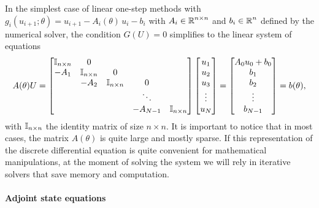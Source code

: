In the simplest case of linear one-step methods with $g_i (u_{i+1}; \theta) = u_{i+1} - A_i (\theta) \, u_i - b_i$ with $A_i \in \operatorname{\mathbb{R}}^{n \times n}$ and $b_i \in \operatorname{\mathbb{R}}^n$ defined by the numerical solver, the condition $G(U)=0$ simplifies to the linear system of equations 
\begin{equation}
    A(\theta) U 
    = 
    \begin{bmatrix}
        \operatorname{\mathbb{I}}_{n \times n} & 0 &   &  & \\
        -A_1 & \operatorname{\mathbb{I}}_{n \times n} & 0 &  &  \\
          & -A_2 & \operatorname{\mathbb{I}}_{n \times n} & 0 &  \\
         &  &   & \ddots &   \\
         &  &  & -A_{N-1} & \operatorname{\mathbb{I}}_{n \times n}
    \end{bmatrix}
    \begin{bmatrix}
        u_1 \\
        u_2 \\
        u_3 \\
        \vdots \\
        u_N
    \end{bmatrix}
    = 
    \begin{bmatrix}
        A_0 u_0 + b_0 \\
        b_1 \\
        b_2 \\
        \vdots \\
        b_{N-1}
    \end{bmatrix}
    = 
    b(\theta), 
\end{equation}
with $\operatorname{\mathbb{I}}_{n \times n}$ the identity matrix of size $n \times n$.
It is important to notice that in most cases, the matrix $A(\theta)$ is quite large and mostly sparse. 
If this representation of the discrete differential equation is quite convenient for mathematical manipulations, at the moment of solving the system we will rely in iterative solvers that save memory and computation. 

\paragraph{Adjoint state equations}

